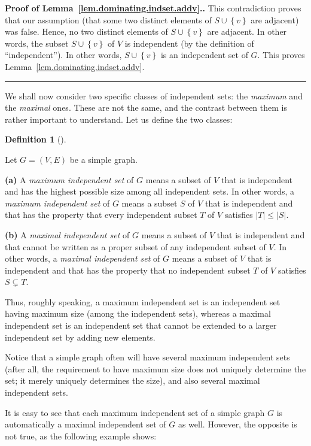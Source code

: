 \documentclass[numbers=enddot,12pt,final,onecolumn,notitlepage]{scrartcl}%
\theoremstyle{definition}
\newtheorem{defi}[theo]{Definition}
\newenvironment{definition}[1][]
{\begin{defi}[#1]\begin{leftbar}}
{\end{leftbar}\end{defi}}
\newenvironment{proof}[1][Proof]{\noindent\textbf{#1.} }{\ \rule{0.5em}{0.5em}}
\newcommand{\set}[1]{\left\{ #1 \right\}}
\newcommand{\abs}[1]{\left| #1 \right|}
\newcommand{\tup}[1]{\left( #1 \right)}
\begin{document}
\begin{proof}[Proof of Lemma~\ref{lem.dominating.indset.addv}.]
This contradiction proves that our assumption (that some two distinct
elements of $S \cup \set{v}$ are adjacent) was false. Hence, no two
distinct elements of $S \cup \set{v}$ are adjacent. In other words,
the subset $S \cup \set{v}$ of $V$ is independent (by the definition
of ``independent''). In other words, $S \cup \set{v}$ is an
independent set of $G$. This proves
Lemma~\ref{lem.dominating.indset.addv}.
\end{proof}

We shall now consider two specific classes of independent sets:
the \textit{maximum} and the \textit{maximal} ones.
These are not the same, and the contrast between them is rather
important to understand. Let us define the two classes:

\begin{definition} \label{def.dominating.indset.max}
Let $G = \tup{V, E}$ be a simple graph.

\textbf{(a)} A \textit{maximum independent set} of $G$ means
a subset of $V$ that is independent and has the highest possible
size among all independent sets. In other words, a
\textit{maximum independent set} of $G$ means a subset $S$ of
$V$ that is independent and that has the property that every
independent subset $T$ of $V$ satisfies $\abs{T} \leq \abs{S}$.

\textbf{(b)} A \textit{maximal independent set} of $G$ means
a subset of $V$ that is independent and that cannot be written
as a proper subset of any independent subset of $V$. In other
words, a \textit{maximal independent set} of $G$ means a subset
of $V$ that is independent and that has the property that no
independent subset $T$ of $V$ satisfies $S \subsetneq T$.
\end{definition}

Thus, roughly speaking, a maximum independent set is an
independent set having maximum size (among the independent sets),
whereas a maximal independent set is an independent set that
cannot be extended to a larger independent set by adding new
elements.

Notice that a simple graph often will have several
maximum independent sets (after all, the requirement to have
maximum size does not uniquely determine the set; it merely
uniquely determines the size), and also several maximal
independent sets.

It is easy to see that each maximum independent set of a
simple graph $G$ is automatically a maximal independent set
of $G$ as well. However, the opposite is not true, as the
following example shows:
\end{document}
